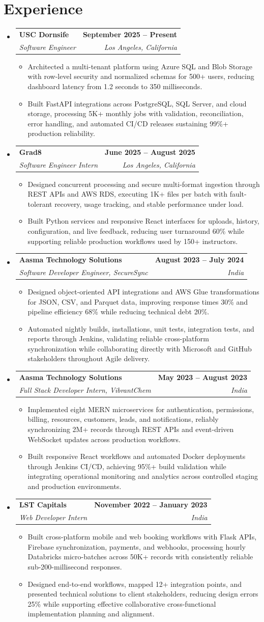 \documentclass[letterpaper,10pt]{article}
\makeatletter
\newcommand{\itemTail}{\vspace{-4pt}}
\newcommand{\sectionGap}{\vspace{-8pt}}
\newcommand{\roleGap}{\vspace{2pt}}
\newcommand{\resumeItem}[1]{\item\small{{#1 \itemTail}}}
\newcommand{\resumeSubheading}[4]{\vspace{-1pt}\item\begin{tabular*}{1.0\textwidth}[t]{l@{\extracolsep{\fill}}r}\textbf{#1} & \textbf{\small #2} \\\textit{\small#3} & \textit{\small #4} \\\end{tabular*}\vspace{-2pt}}
\newcommand{\resumeSubHeadingListStart}{\begin{itemize}[leftmargin=0.0in, label={}]}
\newcommand{\resumeSubHeadingListEnd}{\end{itemize}}
\newcommand{\resumeItemListStart}{\begin{itemize}[leftmargin=0.15in,label=\textbullet,itemsep=3pt,topsep=0pt,parsep=0pt,partopsep=0pt]}
\newcommand{\resumeItemListEnd}{\end{itemize}\vspace{-4pt}}
\makeatother
\begin{document}
\section{Experience}
\resumeSubHeadingListStart
\resumeSubheading{USC Dornsife}{September 2025 -- Present}{Software Engineer}{Los Angeles, California}
\resumeItemListStart
\resumeItem{Architected a multi-tenant platform using Azure SQL and Blob Storage with row-level security and normalized schemas for 500+ users, reducing dashboard latency from 1.2 seconds to 350 milliseconds.}
\resumeItem{Built FastAPI integrations across PostgreSQL, SQL Server, and cloud storage, processing 5K+ monthly jobs with validation, reconciliation, error handling, and automated CI/CD releases sustaining 99\%+ production reliability.}
\resumeItemListEnd
\roleGap
\resumeSubheading{Grad8}{June 2025 -- August 2025}{Software Engineer Intern}{Los Angeles, California}
\resumeItemListStart
\resumeItem{Designed concurrent processing and secure multi-format ingestion through REST APIs and AWS RDS, executing 1K+ files per batch with fault-tolerant recovery, usage tracking, and stable performance under load.}
\resumeItem{Built Python services and responsive React interfaces for uploads, history, configuration, and live feedback, reducing user turnaround 60\% while supporting reliable production workflows used by 150+ instructors.}
\resumeItemListEnd
\roleGap
\resumeSubheading{Aasma Technology Solutions}{August 2023 -- July 2024}{Software Developer Engineer, SecureSync}{India}
\resumeItemListStart
\resumeItem{Designed object-oriented API integrations and AWS Glue transformations for JSON, CSV, and Parquet data, improving response times 30\% and pipeline efficiency 68\% while reducing technical debt 20\%.}
\resumeItem{Automated nightly builds, installations, unit tests, integration tests, and reports through Jenkins, validating reliable cross-platform synchronization while collaborating directly with Microsoft and GitHub stakeholders throughout Agile delivery.}
\resumeItemListEnd
\roleGap
\resumeSubheading{Aasma Technology Solutions}{May 2023 -- August 2023}{Full Stack Developer Intern, VibrantChem}{India}
\resumeItemListStart
\resumeItem{Implemented eight MERN microservices for authentication, permissions, billing, resources, customers, leads, and notifications, reliably synchronizing 2M+ records through REST APIs and event-driven WebSocket updates across production workflows.}
\resumeItem{Built responsive React workflows and automated Docker deployments through Jenkins CI/CD, achieving 95\%+ build validation while integrating operational monitoring and analytics across controlled staging and production environments.}
\resumeItemListEnd
\roleGap
\resumeSubheading{LST Capitals}{November 2022 -- January 2023}{Web Developer Intern}{India}
\resumeItemListStart
\resumeItem{Built cross-platform mobile and web booking workflows with Flask APIs, Firebase synchronization, payments, and webhooks, processing hourly Databricks micro-batches across 50K+ records with consistently reliable sub-200-millisecond responses.}
\resumeItem{Designed end-to-end workflows, mapped 12+ integration points, and presented technical solutions to client stakeholders, reducing design errors 25\% while supporting effective collaborative cross-functional implementation planning and alignment.}
\resumeItemListEnd
\resumeSubHeadingListEnd
\sectionGap
\end{document}
